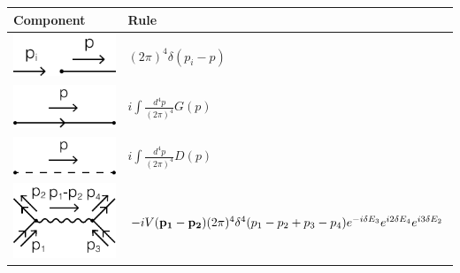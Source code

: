 \documentclass[12pt]{book}
\begin{document}
	\begin{table}[htp!]
		\centering
		\begin{tabular}{| >{\centering\arraybackslash}m{15em}|>{\centering\arraybackslash} m{24em}|}
		\hline
		\vspace{0.5ex}Component\vspace{0.5ex}&\vspace{0.5ex}Rule\vspace{0.5ex}\\
		\hline
		\vspace{2.5ex}\includegraphics[scale=1]{resources/chap_feyn_diag/fdiag_frulep6.pdf}\vspace{1ex}&$(2\pi)^4\delta(p_i-p)$\vspace{0.5ex}\\
		\hline
		\vspace{2.5ex}\includegraphics[scale=1]{resources/chap_feyn_diag/fdiag_frulep1.pdf}\vspace{1ex}&$i\int\frac{d^4p}{(2\pi)^4}G(p)$\vspace{0.5ex}\\
		\hline
		\vspace{2.5ex}\includegraphics[scale=1]{resources/chap_feyn_diag/fdiag_frulep2.pdf}\vspace{1ex}&$i\int\frac{d^4p}{(2\pi)^4}D(p)$\vspace{0.5ex}\\
		\hline
		\vspace{2.5ex}\includegraphics[scale=1]{resources/chap_feyn_diag/fdiag_frulep3.pdf}\vspace{1ex}&$-iV({\bf p_1}-{\bf p_2})(2\pi)^4\delta^4(p_1-p_2+p_3-p_4)e^{-i\delta E_3}e^{i2\delta E_4}e^{i3\delta E_2}$\vspace{0.5ex}\\

\end{tabular}
\end{table}
\end{document}
